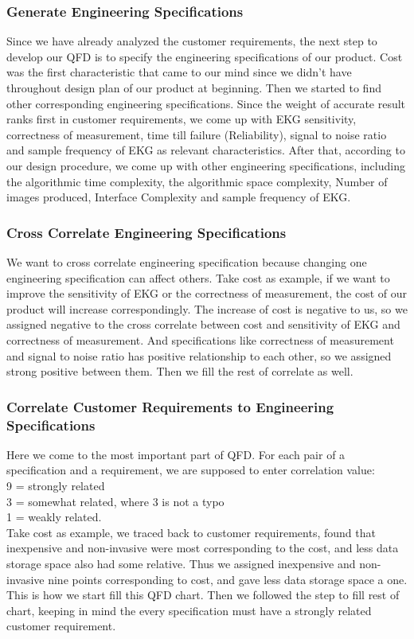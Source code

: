 \documentclass[paper=letter, fontsize=11pt]{scrartcl}
\numberwithin{equation}{section}		%
\numberwithin{figure}{section}			%
\numberwithin{table}{section}			%
\begin{document}
\subsubsection{Generate Engineering Specifications}
Since we have already analyzed the customer requirements, the next step to develop our QFD is to specify the engineering specifications of our product. Cost was the first characteristic that came to our mind since we didn't have throughout design plan of our product at beginning.  Then we started to find other corresponding engineering specifications. Since the weight of accurate result ranks first in customer requirements, we come up with EKG sensitivity, correctness of measurement, time till failure (Reliability), signal to noise ratio and sample frequency of EKG as relevant characteristics. After that, according to our design procedure, we come up with other engineering specifications, including the algorithmic time complexity, the algorithmic space complexity, Number of images produced, Interface Complexity and sample frequency of EKG.

\subsubsection{Cross Correlate Engineering Specifications}
We want to cross correlate engineering specification because changing one engineering specification can affect others. Take cost as example, if we want to improve the sensitivity of EKG or the correctness of measurement, the cost of our product will increase correspondingly. The increase of cost is negative to us, so we assigned negative to the cross correlate between cost and sensitivity of EKG and correctness of measurement. And specifications like correctness of measurement and signal to noise ratio has positive relationship to each other, so we assigned strong positive between them. Then we fill the rest of correlate as well.

\subsubsection{Correlate Customer Requirements to Engineering Specifications}
Here we come to the most important part of QFD. For each pair of a specification and a requirement, we are supposed to enter correlation value\cite{450}: \\
9 = strongly related \\
3 = somewhat related, where 3 is not a typo \\
1 = weakly related. \\
Take cost as example, we traced back to customer requirements, found that inexpensive and non-invasive were most corresponding to the cost, and less data storage space also had some relative. Thus we assigned inexpensive and non-invasive nine points corresponding to cost, and gave less data storage space a one. This is how we start fill this QFD chart. Then we followed the step to fill rest of chart, keeping in mind the every specification must have a strongly related customer requirement.
\end{document}

